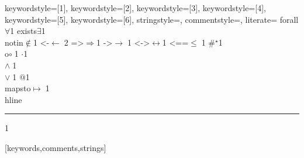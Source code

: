 {%
    keywordstyle=[1]{\ttfamily},
    keywordstyle=[2]{\ttfamily},
    keywordstyle=[3]{\ttfamily},
    keywordstyle=[4]{\ttfamily},
    keywordstyle=[5]{\ttfamily},
    keywordstyle=[6]{\ttfamily},
    stringstyle=\ttfamily,
    commentstyle={\ttfamily},
    literate=
        {forall}{$\forall$}1
        {exists}{{$\exists$}}1
        {\\notin}{{$\notin$}}1
        {<-}{{$\leftarrow\;$}}2
        {=>}{{$\Rightarrow$}}1
        {->}{$\rightarrow\;$}1
        {<->}{$\leftrightarrow$}1
        {<==}{{$\leq\;$}}1
        {\#}{{$^\star$}}1
        {\\o}{{$\circ\;$}}1
        {\@}{{$\cdot$}}1
        {\/\\}{{$\wedge\;$}}1
        {\\\/}{{$\vee\;$}}1
        {\@\@}{{$@$}}1
        {\\mapsto}{{$\mapsto\;$}}1
        {\\hline}{{\rule{\linewidth}{0.5pt}}}1
%
}[keywords,comments,strings]